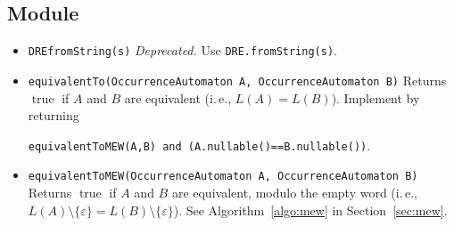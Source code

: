 \documentclass[a4paper,11pt, svgnames,titlepage]{article}
\newcommand{\emptyword}{\varepsilon}
\DeclareMathOperator{\incomp}{\#}
\newcommand{\true}{\ensuremath{\operatorname{true}}\xspace}
\begin{document}
\subsection{Module}\label{sec:des:mod}
\begin{itemize}
	\item\texttt{DREfromString(s)} \emph{Deprecated.} Use \texttt{DRE.fromString(s)}.
\item\texttt{equivalentTo(OccurrenceAutomaton A, OccurrenceAutomaton B)} Returns $\true$ if $A$ and $B$ are equivalent (i.\,e., $L(A)=L(B)$). Implement by returning 
\begin{center}
	\texttt{equivalentToMEW(A,B) and (A.nullable()==B.nullable())}.
\end{center}
\item\texttt{equivalentToMEW(OccurrenceAutomaton A, OccurrenceAutomaton B)} Returns $\true$ if $A$ and $B$ are equivalent, modulo the empty word (i.\,e., $L(A)\setminus\{\emptyword\}=L(B)\setminus\{\emptyword\}$). See Algorithm~\ref{algo:mew} in Section~\ref{sec:mew}.

\end{itemize}
\end{document}
